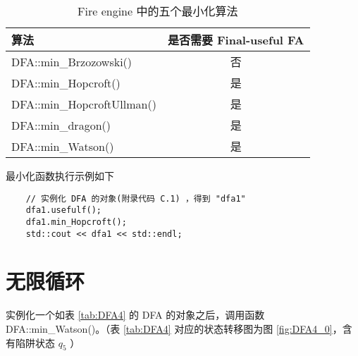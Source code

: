 \begin{table}[!htbp]
    \caption{Fire engine 中的五个最小化算法}
    \label{tab:listMinAl}
    \centering
    \small%
    \setlength{\tabcolsep}{6pt}%
    \renewcommand{\arraystretch}{1.2}%
        \begin{tabular}{l c }
        \toprule %
        算法 & 是否需要 Final-useful FA  \\
        \midrule%
        DFA::min\_Brzozowski()     & 否 \\
        DFA::min\_Hopcroft()       & 是 \\
        DFA::min\_HopcroftUllman() & 是 \\ 
        DFA::min\_dragon()         & 是 \\
        DFA::min\_Watson()         & 是 \\
        \bottomrule%
    \end{tabular}
\end{table}

\begin{example}
    最小化函数执行示例如下
\begin{lstlisting}
    // 实例化 DFA 的对象(附录代码 C.1) ，得到 "dfa1"
    dfa1.usefulf();
    dfa1.min_Hopcroft();
    std::cout << dfa1 << std::endl;
\end{lstlisting}
\end{example}





\section{无限循环}\label{sec:ohloop}

实例化一个如表 \ref{tab:DFA4} 的 DFA 的对象之后，调用函数 DFA::min\_Watson()。（表 \ref{tab:DFA4} 对应的状态转移图为图 \ref{fig:DFA4_0}，含有陷阱状态 $q_5$ ）

